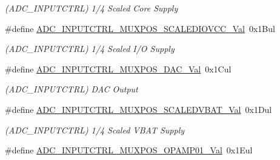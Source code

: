 \begin{DoxyCompactItemize}
\begin{DoxyCompactList}\small\item\em (A\+D\+C\+\_\+\+I\+N\+P\+U\+T\+C\+T\+R\+L) 1/4 Scaled Core Supply \end{DoxyCompactList}\item 
\hypertarget{group___s_a_m_l21___a_d_c_ga3d2c77a183f5a2294d33f2bbc77fa637}{}\#define \hyperlink{group___s_a_m_l21___a_d_c_ga3d2c77a183f5a2294d33f2bbc77fa637}{A\+D\+C\+\_\+\+I\+N\+P\+U\+T\+C\+T\+R\+L\+\_\+\+M\+U\+X\+P\+O\+S\+\_\+\+S\+C\+A\+L\+E\+D\+I\+O\+V\+C\+C\+\_\+\+Val}~0x1\+Bul\label{group___s_a_m_l21___a_d_c_ga3d2c77a183f5a2294d33f2bbc77fa637}

\begin{DoxyCompactList}\small\item\em (A\+D\+C\+\_\+\+I\+N\+P\+U\+T\+C\+T\+R\+L) 1/4 Scaled I/\+O Supply \end{DoxyCompactList}\item 
\hypertarget{group___s_a_m_l21___a_d_c_ga3dcf66ff42fdb4efc566c4790b431ed9}{}\#define \hyperlink{group___s_a_m_l21___a_d_c_ga3dcf66ff42fdb4efc566c4790b431ed9}{A\+D\+C\+\_\+\+I\+N\+P\+U\+T\+C\+T\+R\+L\+\_\+\+M\+U\+X\+P\+O\+S\+\_\+\+D\+A\+C\+\_\+\+Val}~0x1\+Cul\label{group___s_a_m_l21___a_d_c_ga3dcf66ff42fdb4efc566c4790b431ed9}

\begin{DoxyCompactList}\small\item\em (A\+D\+C\+\_\+\+I\+N\+P\+U\+T\+C\+T\+R\+L) D\+A\+C Output \end{DoxyCompactList}\item 
\hypertarget{group___s_a_m_l21___a_d_c_gaab9c614fcc1fd111292116ba7f0e049d}{}\#define \hyperlink{group___s_a_m_l21___a_d_c_gaab9c614fcc1fd111292116ba7f0e049d}{A\+D\+C\+\_\+\+I\+N\+P\+U\+T\+C\+T\+R\+L\+\_\+\+M\+U\+X\+P\+O\+S\+\_\+\+S\+C\+A\+L\+E\+D\+V\+B\+A\+T\+\_\+\+Val}~0x1\+Dul\label{group___s_a_m_l21___a_d_c_gaab9c614fcc1fd111292116ba7f0e049d}

\begin{DoxyCompactList}\small\item\em (A\+D\+C\+\_\+\+I\+N\+P\+U\+T\+C\+T\+R\+L) 1/4 Scaled V\+B\+A\+T Supply \end{DoxyCompactList}\item 
\hypertarget{group___s_a_m_l21___a_d_c_gaaf94029e0fc0e6d9515182fedea39774}{}\#define \hyperlink{group___s_a_m_l21___a_d_c_gaaf94029e0fc0e6d9515182fedea39774}{A\+D\+C\+\_\+\+I\+N\+P\+U\+T\+C\+T\+R\+L\+\_\+\+M\+U\+X\+P\+O\+S\+\_\+\+O\+P\+A\+M\+P01\+\_\+\+Val}~0x1\+Eul\label{group___s_a_m_l21___a_d_c_gaaf94029e0fc0e6d9515182fedea39774}


\end{DoxyCompactItemize}
